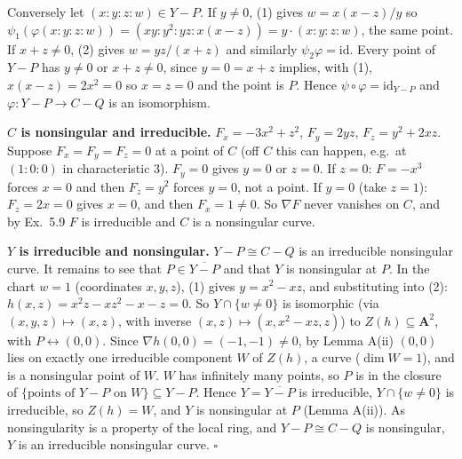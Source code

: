 \documentclass[11pt]{article}
\begin{document}
Conversely let $(x:y:z:w)\in Y-P$. If $y\ne0$, (1) gives $w=x(x-z)/y$ so $\psi_1(\varphi(x:y:z:w))=(xy:y^2:yz:x(x-z))=y\cdot(x:y:z:w)$, the same point. If $x+z\ne0$, (2) gives $w=yz/(x+z)$ and similarly $\psi_2\varphi=\mathrm{id}$. Every point of $Y-P$ has $y\ne0$ or $x+z\neq0$, since $y=0=x+z$ implies, with (1), $x(x-z)=2x^2=0$ so $x=z=0$ and the point is $P$. Hence $\psi\circ\varphi=\mathrm{id}_{Y-P}$ and $\varphi:Y-P\to C-Q$ is an isomorphism.

\textbf{$C$ is nonsingular and irreducible.} $F_x=-3x^2+z^2$, $F_y=2yz$, $F_z=y^2+2xz$. Suppose $F_x=F_y=F_z=0$ at a point of $C$ (off $C$ this can happen, e.g.\ at $(1:0:0)$ in characteristic $3$). $F_y=0$ gives $y=0$ or $z=0$. If $z=0$: $F=-x^3$ forces $x=0$ and then $F_z=y^2$ forces $y=0$, not a point. If $y=0$ (take $z=1$): $F_z=2x=0$ gives $x=0$, and then $F_x=1\ne0$. So $\nabla F$ never vanishes on $C$, and by Ex.~5.9 $F$ is irreducible and $C$ is a nonsingular curve.

\textbf{$Y$ is irreducible and nonsingular.} $Y-P\cong C-Q$ is an irreducible nonsingular curve. It remains to see that $P\in\overline{Y-P}$ and that $Y$ is nonsingular at $P$. In the chart $w=1$ (coordinates $x,y,z$), (1) gives $y=x^2-xz$, and substituting into (2): $h(x,z)=x^2z-xz^2-x-z=0$. So $Y\cap\{w\ne0\}$ is isomorphic (via $(x,y,z)\mapsto(x,z)$, with inverse $(x,z)\mapsto(x,x^2-xz,z)$) to $Z(h)\subseteq\mathbf A^2$, with $P\leftrightarrow(0,0)$. Since $\nabla h(0,0)=(-1,-1)\neq0$, by Lemma A(ii) $(0,0)$ lies on exactly one irreducible component $W$ of $Z(h)$, a curve ($\dim W=1$), and is a nonsingular point of $W$. $W$ has infinitely many points, so $P$ is in the closure of $\{\text{points of }Y-P\text{ on }W\}\subseteq Y-P$. Hence $Y=\overline{Y-P}$ is irreducible, $Y\cap\{w\neq0\}$ is irreducible, so $Z(h)=W$, and $Y$ is nonsingular at $P$ (Lemma A(ii)). As nonsingularity is a property of the local ring, and $Y-P\cong C-Q$ is nonsingular, $Y$ is an irreducible nonsingular curve. \hfill$\square$
\end{document}
